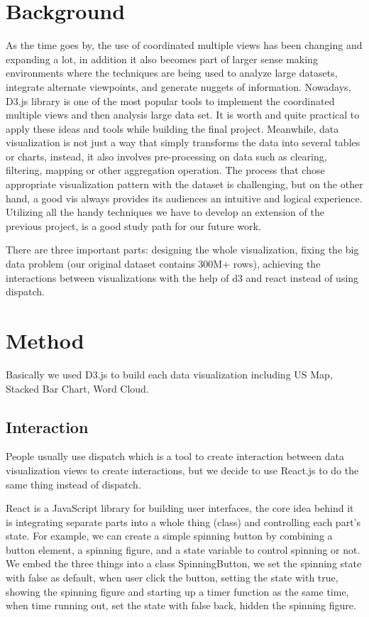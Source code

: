 
\testfigure


\section{Background}
As the time goes by, the use of coordinated multiple views has been changing and expanding a lot, in addition it also becomes part of larger sense making environments where the techniques are being used to analyze large datasets, integrate alternate viewpoints, and generate nuggets of information.\cite{roberts2007state} Nowadays, D3.js library is one of the most popular tools to implement the coordinated multiple views and then analysis large data set. It is worth and quite practical to apply these ideas and tools while building the final project. Meanwhile, data visualization is not just a way that simply transforms the data into several tables or charts, instead, it also involves pre-processing on data such as clearing, filtering, mapping or other aggregation operation. The process that chose appropriate visualization pattern with the dataset is challenging, but on the other hand, a good vis always provides its audiences an intuitive and logical experience. Utilizing all the handy techniques we have to develop an extension of the previous project, is a good study path for our future work.

There are three important parts: designing the whole visualization, fixing the big data problem (our original dataset contains 300M+ rows), achieving the interactions between visualizations with the help of d3 and react instead of using dispatch.

\section{Method}

Basically we used D3.js to build each data visualization including US Map, Stacked Bar Chart, Word Cloud. 

\subsection{Interaction}
People usually use dispatch which is a tool to create interaction between data visualization views to create interactions, but we decide to use React.js to do the same thing instead of dispatch.

React is a JavaScript library for building user interfaces, the core idea behind it is integrating separate parts into a whole thing (class) and controlling each part's state. For example, we can create a simple spinning button by combining a button element, a spinning figure, and a state variable to control spinning or not. We embed the three things into a class SpinningButton, we set the spinning state with false as default, when user click the button, setting the state with true, showing the spinning figure and starting up a timer function as the same time, when time running out, set the state with false back, hidden the spinning figure. 

